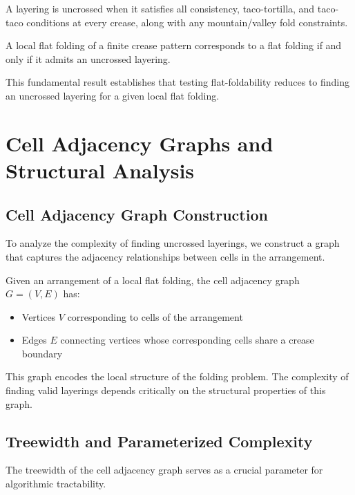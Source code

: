 \begin{definition}
A layering is uncrossed when it satisfies all consistency, taco-tortilla, and taco-taco conditions at every crease, along with any mountain/valley fold constraints.
\end{definition}

\begin{lemma}
A local flat folding of a finite crease pattern corresponds to a flat folding if and only if it admits an uncrossed layering.
\end{lemma}

This fundamental result establishes that testing flat-foldability reduces to finding an uncrossed layering for a given local flat folding.

\section{Cell Adjacency Graphs and Structural Analysis}

\subsection{Cell Adjacency Graph Construction}

To analyze the complexity of finding uncrossed layerings, we construct a graph that captures the adjacency relationships between cells in the arrangement.

\begin{definition}
Given an arrangement of a local flat folding, the cell adjacency graph $G = (V, E)$ has:
\begin{itemize}
\item Vertices $V$ corresponding to cells of the arrangement
\item Edges $E$ connecting vertices whose corresponding cells share a crease boundary
\end{itemize}
\end{definition}

This graph encodes the local structure of the folding problem. The complexity of finding valid layerings depends critically on the structural properties of this graph.

\subsection{Treewidth and Parameterized Complexity}

The treewidth of the cell adjacency graph serves as a crucial parameter for algorithmic tractability.

